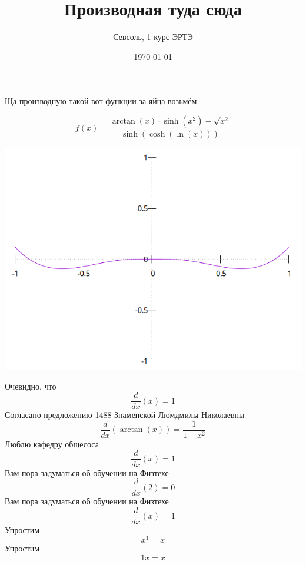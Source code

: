 \documentclass[12pt, a4paper]{article}
\begin{document}
\title{Производная туда сюда
}\author{Севсоль, 1 курс ЭРТЭ}
\date{\today}
\maketitle 
\centerline{Ща производную такой вот функции за яйца возьмём}
\begin{equation}
f(x) = \frac{\arctan(x) \cdot \sinh({x}^{2})-\sqrt{{x}^{2}}}{\sinh(\cosh(\ln(x)))}
\end{equation}
\begin{center}
\includegraphics[scale=0.5]{start_func.png}
\end{center}
Очевидно, что
\begin{equation}
\frac{d}{dx}(x) = 1
\end{equation}
Согласано предложению 1488 Знаменской Люмдмилы Николаевны
\begin{equation}
\frac{d}{dx}(\arctan(x)) = \frac{1}{1+{x}^{2}}
\end{equation}
Люблю кафедру общесоса
\begin{equation}
\frac{d}{dx}(x) = 1
\end{equation}
Вам пора задуматься об обучении на Физтехе
\begin{equation}
\frac{d}{dx}(2) = 0
\end{equation}
Вам пора задуматься об обучении на Физтехе
\begin{equation}
\frac{d}{dx}(x) = 1
\end{equation}
Упростим
\begin{equation}
{x}^{1} = x
\end{equation}
Упростим
\begin{equation}
1x = x
\end{equation}
\end{document}
